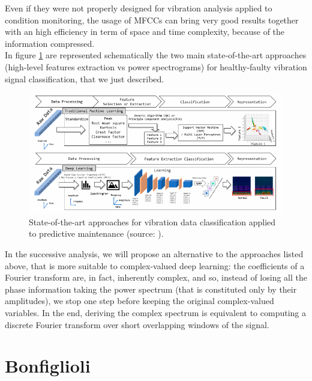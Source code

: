 \documentclass[../main.tex]{subfiles}
\begin{document}
Even if they were not properly designed for vibration analysis applied to condition monitoring, the usage of MFCCs can bring very good results together with an high efficiency in term of space and time complexity, because of the information compressed.\\
In figure \ref{fig:summary_hf_classification_methods} are represented schematically the two main state-of-the-art approaches (high-level features extraction vs power spectrograms) for healthy-faulty vibration signal classification, that we just described.\\
\begin{figure}[ht]
	\centering
	\includegraphics[width=\textwidth]{pictures/summary_hf_classification_methods.pdf}
	\caption{State-of-the-art approaches for vibration data classification applied to predictive maintenance (source: \cite{deep_learning_vibration_gravity}).}
	\label{fig:summary_hf_classification_methods}	
\end{figure}
In the successive analysis, we will propose an alternative to the approaches listed above, that is more suitable to complex-valued deep learning: the coefficients of a Fourier transform are, in fact, inherently complex, and so, instead of losing all the phase information taking the power spectrum (that is constituted only by their amplitudes), we stop one step before keeping the original complex-valued variables. In the end, deriving the complex spectrum is equivalent to computing a discrete Fourier transform over short overlapping windows of the signal.

\section{Bonfiglioli}
\end{document}
